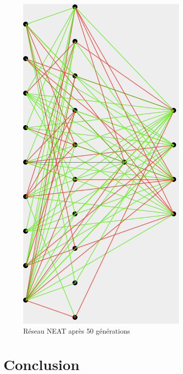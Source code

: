 \documentclass{article}
\begin{document}
\begin{figure}[H]
\begin{center}
	\includegraphics[scale=0.45]{neatevolv.png}
	\caption{Réseau NEAT après 50 générations}
\end{center}
\end{figure}

\newpage
\section{Conclusion}

\newpage


\end{document}
